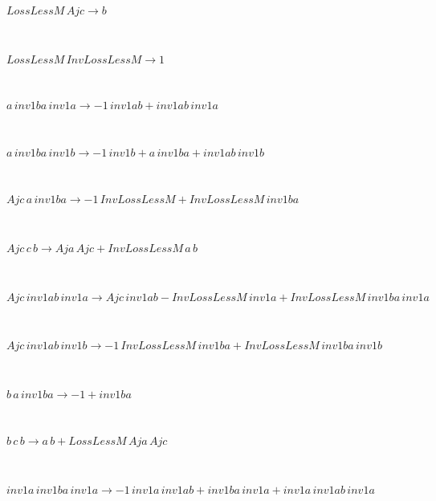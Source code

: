 \documentclass[rep10,leqno]{report}
\begin{document}
\begin{minipage}{6in}
$
LossLessM\,
 Ajc\rightarrow b
$
\end{minipage}\medskip \\
\begin{minipage}{6in}
$
LossLessM\,
 InvLossLessM\rightarrow 1
$
\end{minipage}\medskip \\
\begin{minipage}{6in}
$
a\,
 inv1ba\,
 inv1a\rightarrow -1\,
 inv1ab + inv1ab\,
 inv1a
$
\end{minipage}\medskip \\
\begin{minipage}{6in}
$
a\,
 inv1ba\,
 inv1b\rightarrow -1\,
 inv1b + a\,
 inv1ba + inv1ab\,
 inv1b
$
\end{minipage}\medskip \\
\begin{minipage}{6in}
$
Ajc\,
 a\,
 inv1ba\rightarrow -1\,
 InvLossLessM + InvLossLessM\,
 inv1ba
$
\end{minipage}\medskip \\
\begin{minipage}{6in}
$
Ajc\,
 c\,
 b\rightarrow Aja\,
 Ajc + InvLossLessM\,
 a\,
 b
$
\end{minipage}\medskip \\
\begin{minipage}{6in}
$
Ajc\,
 inv1ab\,
 inv1a\rightarrow Ajc\,
 inv1ab - InvLossLessM\,
 inv1a + InvLossLessM\,
 inv1ba\,
 inv1a
$
\end{minipage}\medskip \\
\begin{minipage}{6in}
$
Ajc\,
 inv1ab\,
 inv1b\rightarrow -1\,
 InvLossLessM\,
 inv1ba + InvLossLessM\,
 inv1ba\,
 inv1b
$
\end{minipage}\medskip \\
\begin{minipage}{6in}
$
b\,
 a\,
 inv1ba\rightarrow -1 + inv1ba
$
\end{minipage}\medskip \\
\begin{minipage}{6in}
$
b\,
 c\,
 b\rightarrow a\,
 b + LossLessM\,
 Aja\,
 Ajc
$
\end{minipage}\medskip \\
\begin{minipage}{6in}
$
inv1a\,
 inv1ba\,
 inv1a\rightarrow -1\,
 inv1a\,
 inv1ab + inv1ba\,
 inv1a + inv1a\,
 inv1ab\,
 inv1a
$
\end{minipage}\medskip \\
\end{document}
